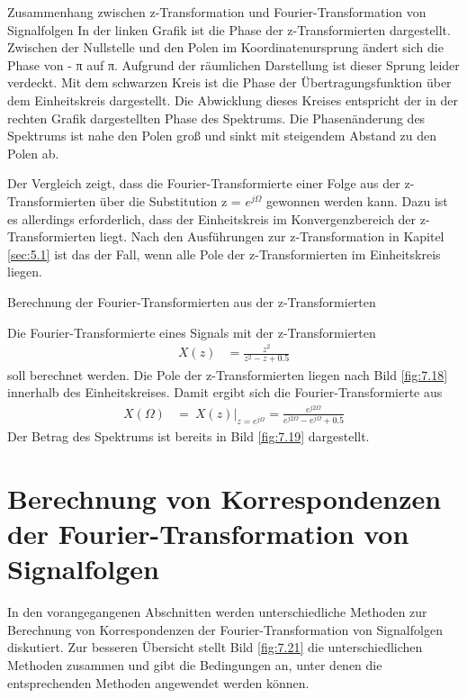 \begin{example}{Zusammenhang zwischen z-Transformation und Fourier-Transformation von Signalfolgen}
In der linken Grafik ist die Phase der z-Transformierten dargestellt. Zwischen der Nullstelle und den Polen im Koordinatenursprung ändert sich die Phase von - π auf π. Aufgrund der räumlichen Darstellung ist dieser Sprung leider verdeckt. Mit dem schwarzen Kreis ist die Phase der Übertragungsfunktion über dem Einheitskreis dargestellt. Die Abwicklung dieses Kreises entspricht der in der rechten Grafik dargestellten Phase des Spektrums. Die Phasenänderung des Spektrums ist nahe den Polen groß und sinkt mit steigendem Abstand zu den Polen ab.

\end{example}

Der Vergleich zeigt, dass die Fourier-Transformierte einer Folge aus der z-Transformierten über die Substitution z = \(e^{jΩ}\) gewonnen werden kann. Dazu ist es allerdings erforderlich, dass der Einheitskreis im Konvergenzbereich der z-Transformierten liegt. Nach den Ausführungen zur z-Transformation in Kapitel \ref{sec:5.1} ist das der Fall, wenn alle Pole der z-Transformierten im Einheitskreis liegen.

\begin{example}{Berechnung der Fourier-Transformierten aus der z-Transformierten}
\label{example:beispiel-berechnung-der-fourier-transformierten-aus-der-z-transformierten}

Die Fourier-Transformierte eines Signals mit der z-Transformierten
\begin{align*}
X(z) &= \frac{z^{2}}{z^{2} - z + 0.5} 
\end{align*}
soll berechnet werden. Die Pole der z-Transformierten liegen nach Bild \ref{fig:7.18} innerhalb des Einheitskreises. Damit ergibt sich die Fourier-Transformierte aus
\begin{align*}
X(\Omega) &= \left. \ X(z) \right|_{z = e^{j  \Omega}} = \frac{e^{j  2  \Omega}}{e^{j  2  \Omega} - e^{j  \Omega} + 0.5} 
\end{align*}
Der Betrag des Spektrums ist bereits in Bild \ref{fig:7.19} dargestellt.

\end{example}

\section{Berechnung von Korrespondenzen der Fourier-Transformation von Signalfolgen}\label{sec:7.4}

In den vorangegangenen Abschnitten werden unterschiedliche Methoden zur Berechnung von Korrespondenzen der Fourier-Transformation von Signalfolgen diskutiert. Zur besseren Übersicht stellt Bild \ref{fig:7.21} die unterschiedlichen Methoden zusammen und gibt die Bedingungen an, unter denen die entsprechenden Methoden angewendet werden können.

